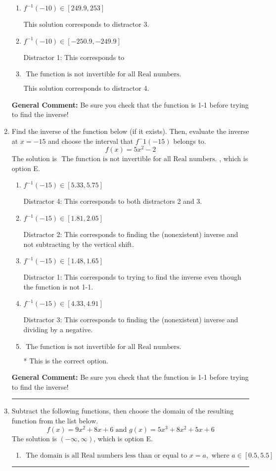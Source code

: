 \documentclass{extbook}[14pt]
\newcommand{\litem}[1]{\item #1

\rule{\textwidth}{0.4pt}}
\begin{document}
\begin{enumerate}
{\begin{enumerate}[label=\Alph*.]
 This solution corresponds to distractor 2.
\item \( f^{-1}(-10) \in [249.9, 253] \)

 This solution corresponds to distractor 3.
\item \( f^{-1}(-10) \in [-250.9, -249.9] \)

 Distractor 1: This corresponds to 
\item \( \text{ The function is not invertible for all Real numbers. } \)

 This solution corresponds to distractor 4.
\end{enumerate}

\textbf{General Comment:} Be sure you check that the function is 1-1 before trying to find the inverse!
}
\litem{
Find the inverse of the function below (if it exists). Then, evaluate the inverse at $x = -15$ and choose the interval that $f^-1(-15)$ belongs to.
\[ f(x) = 5 x^2 - 2 \]The solution is \( \text{ The function is not invertible for all Real numbers. } \), which is option E.\begin{enumerate}[label=\Alph*.]
\item \( f^{-1}(-15) \in [5.33, 5.75] \)

 Distractor 4: This corresponds to both distractors 2 and 3.
\item \( f^{-1}(-15) \in [1.81, 2.05] \)

 Distractor 2: This corresponds to finding the (nonexistent) inverse and not subtracting by the vertical shift.
\item \( f^{-1}(-15) \in [1.48, 1.65] \)

 Distractor 1: This corresponds to trying to find the inverse even though the function is not 1-1. 
\item \( f^{-1}(-15) \in [4.33, 4.91] \)

 Distractor 3: This corresponds to finding the (nonexistent) inverse and dividing by a negative.
\item \( \text{ The function is not invertible for all Real numbers. } \)

* This is the correct option.
\end{enumerate}

\textbf{General Comment:} Be sure you check that the function is 1-1 before trying to find the inverse!
}
\litem{
Subtract the following functions, then choose the domain of the resulting function from the list below.
\[ f(x) = 9x^{2} +8 x + 6 \text{ and } g(x) = 5x^{3} +8 x^{2} +5 x + 6 \]The solution is \( (-\infty, \infty) \), which is option E.\begin{enumerate}[label=\Alph*.]
\item \( \text{ The domain is all Real numbers less than or equal to } x = a, \text{ where } a \in [0.5, 5.5] \)



\end{enumerate}}
\end{enumerate}
\end{document}
